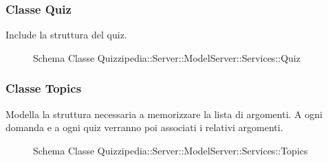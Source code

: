 \subsubsection{Classe Quiz}
Include la struttura del quiz.
\begin{figure}[H]
\centering
\noindent{}
\caption{Schema Classe Quizzipedia::Server::ModelServer::Services::Quiz}
\end{figure}
\subsubsection{Classe Topics}
Modella la struttura necessaria a memorizzare la lista di argomenti. A ogni domanda e a ogni quiz verranno poi associati i relativi argomenti.
\begin{figure}[H]
\centering
\noindent{}
\caption{Schema Classe Quizzipedia::Server::ModelServer::Services::Topics}
\end{figure}
